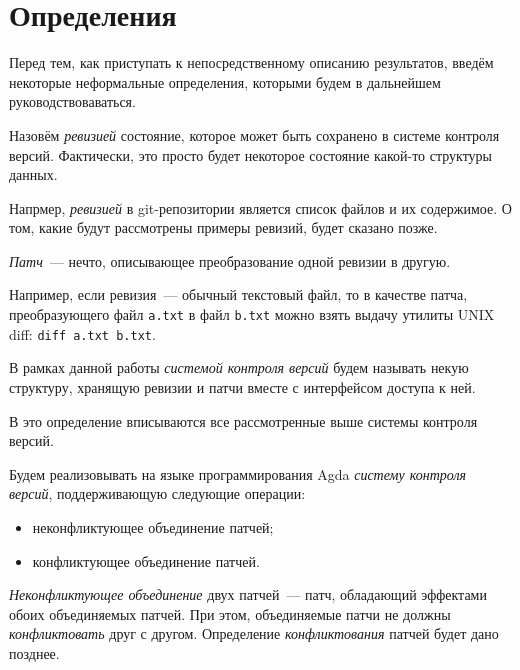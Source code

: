 \section{Определения}

Перед тем, как приступать к непосредственному описанию результатов,
введём некоторые неформальные определения, которыми будем в дальнейшем
руководствоваваться. 

\begin{definition}[Ревизия]
  Назовём \emph{ревизией} состояние, которое может быть сохранено в
  системе контроля версий. Фактически, это просто будет некоторое
  состояние какой-то структуры данных.
\end{definition}

Напрмер, \emph{ревизией} в git-репозитории является список файлов и их
содержимое. О том, какие будут рассмотрены примеры ревизий, будет
сказано позже.

\begin{definition}[Патч]
  \emph{Патч}~--- нечто, описывающее преобразование одной ревизии в
  другую.
\end{definition}

Например, если ревизия~--- обычный текстовый файл, то в качестве
патча, преобразующего файл \texttt{a.txt} в файл \texttt{b.txt} можно
взять выдачу утилиты UNIX diff: \texttt{diff a.txt b.txt}. 

\begin{definition}
  В рамках данной работы \emph{системой контроля версий} будем
  называть некую структуру, хранящую ревизии и патчи вместе с
  интерфейсом доступа к ней.
\end{definition}

В это определение вписываются все рассмотренные выше системы контроля
версий. 

Будем реализовывать на языке программирования Agda \emph{систему
  контроля версий}, поддерживающую следующие операции:
\begin{itemize}
\item неконфликтующее объединение патчей;
\item конфликтующее объединение патчей.
\end{itemize}

\begin{definition}
  \emph{Неконфликтующее объединение} двух патчей~--- патч, обладающий
  эффектами обоих объединяемых патчей. При этом, объединяемые патчи не
  должны \emph{конфликтовать} друг с другом. Определение
  \emph{конфликтования} патчей будет дано позднее.
\end{definition}

